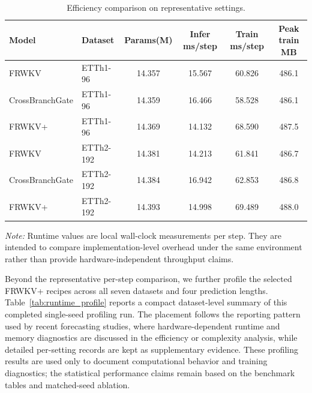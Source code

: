 \documentclass[a4paper,fleqn]{cas-sc}
\begin{document}
\begin{table}[t]
\centering
\caption{Efficiency comparison on representative settings.}
\label{tab:eff}
\scriptsize
\begin{tabular}{llcccc}
\toprule
Model & Dataset & Params(M) & Infer ms/step & Train ms/step & Peak train MB \\
\midrule
FRWKV & ETTh1-96 & 14.357 & 15.567 & 60.826 & 486.1 \\
CrossBranchGate & ETTh1-96 & 14.359 & 16.466 & 58.528 & 486.1 \\
FRWKV+ & ETTh1-96 & 14.369 & 14.132 & 68.590 & 487.5 \\
FRWKV & ETTh2-192 & 14.381 & 14.213 & 61.841 & 486.7 \\
CrossBranchGate & ETTh2-192 & 14.384 & 16.942 & 62.853 & 486.8 \\
FRWKV+ & ETTh2-192 & 14.393 & 14.998 & 69.489 & 488.0 \\
\bottomrule
\end{tabular}
\par\smallskip
\begin{minipage}{\textwidth}
\footnotesize \emph{Note:} Runtime values are local wall-clock measurements per step. They are intended to compare implementation-level overhead under the same environment rather than provide hardware-independent throughput claims.
\end{minipage}
\end{table}

Beyond the representative per-step comparison, we further profile the selected FRWKV+ recipes across all seven datasets and four prediction lengths. Table~\ref{tab:runtime_profile} reports a compact dataset-level summary of this completed single-seed profiling run. The placement follows the reporting pattern used by recent forecasting studies, where hardware-dependent runtime and memory diagnostics are discussed in the efficiency or complexity analysis, while detailed per-setting records are kept as supplementary evidence. These profiling results are used only to document computational behavior and training diagnostics; the statistical performance claims remain based on the benchmark tables and matched-seed ablation.
\end{document}
